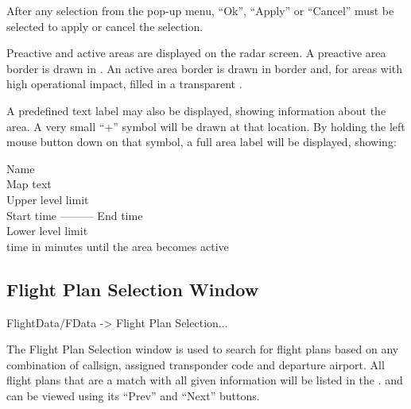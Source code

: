 \documentclass[a4paper,oneside,11pt]{memoir}
\begin{document}
\bigskip

After any selection from the pop-up menu, “Ok”, “Apply” or “Cancel” must be selected to apply or cancel the selection. 

\bigskip

Preactive and active areas are displayed on the radar screen. A preactive area border is drawn in . An active area border is drawn in  border and, for areas with high operational impact, filled in a transparent . 

  

\bigskip

A predefined text label may also be displayed, showing information about the area. A very small “+” symbol will be drawn at that location. By holding the left mouse button down on that symbol, a full area label will be displayed, showing:

\begin{center}
        Name\\ 
        Map text\\
        Upper level limit\\
        Start time --------- End time\\
        Lower level limit\\
        time in minutes until the area becomes active\\
\end{center}

\subsection{Flight Plan Selection Window}
\label{win:fpsw}

 FlightData/FData -> Flight Plan Selection...

\bigskip


The Flight Plan Selection window is used to search for flight plans based on any combination of callsign, assigned transponder code and departure airport. All flight plans that are a match with all given information will be listed in the . and can be viewed using its “Prev” and “Next” buttons.

\bigskip
\end{document}
